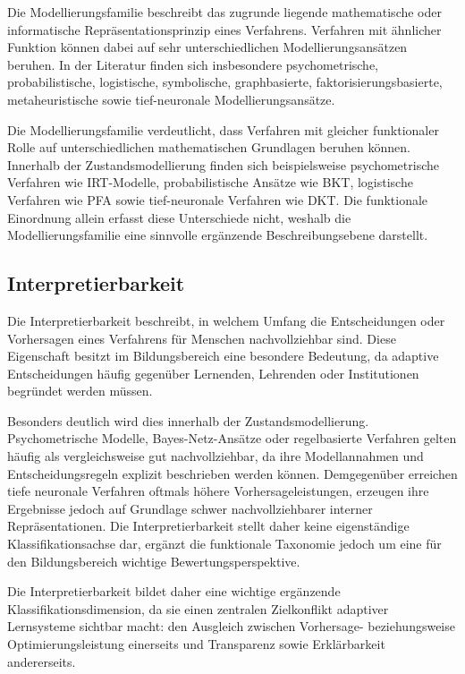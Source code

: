 Die Modellierungsfamilie beschreibt das zugrunde liegende mathematische
oder informatische Repräsentationsprinzip eines Verfahrens. Verfahren
mit ähnlicher Funktion können dabei auf sehr unterschiedlichen
Modellierungsansätzen beruhen. In der Literatur finden sich insbesondere
psychometrische, probabilistische, logistische, symbolische,
graphbasierte, faktorisierungsbasierte, metaheuristische sowie
tief-neuronale Modellierungsansätze.

Die Modellierungsfamilie verdeutlicht, dass Verfahren mit gleicher
funktionaler Rolle auf unterschiedlichen mathematischen Grundlagen
beruhen können. Innerhalb der Zustandsmodellierung finden sich
beispielsweise psychometrische Verfahren wie IRT-Modelle,
probabilistische Ansätze wie BKT, logistische Verfahren wie PFA sowie
tief-neuronale Verfahren wie DKT. Die funktionale Einordnung allein
erfasst diese Unterschiede nicht, weshalb die Modellierungsfamilie eine
sinnvolle ergänzende Beschreibungsebene darstellt.

\subsection{Interpretierbarkeit}\label{interpretierbarkeit}

Die Interpretierbarkeit beschreibt, in welchem Umfang die Entscheidungen
oder Vorhersagen eines Verfahrens für Menschen nachvollziehbar sind.
Diese Eigenschaft besitzt im Bildungsbereich eine besondere Bedeutung,
da adaptive Entscheidungen häufig gegenüber Lernenden, Lehrenden oder
Institutionen begründet werden müssen.

Besonders deutlich wird dies innerhalb der Zustandsmodellierung.
Psychometrische Modelle, Bayes-Netz-Ansätze oder regelbasierte Verfahren
gelten häufig als vergleichsweise gut nachvollziehbar, da ihre
Modellannahmen und Entscheidungsregeln explizit beschrieben werden
können. Demgegenüber erreichen tiefe neuronale Verfahren oftmals höhere
Vorhersageleistungen, erzeugen ihre Ergebnisse jedoch auf Grundlage
schwer nachvollziehbarer interner Repräsentationen. Die
Interpretierbarkeit stellt daher keine eigenständige
Klassifikationsachse dar, ergänzt die funktionale Taxonomie jedoch um
eine für den Bildungsbereich wichtige Bewertungsperspektive.

Die Interpretierbarkeit bildet daher eine wichtige ergänzende
Klassifikationsdimension, da sie einen zentralen Zielkonflikt adaptiver
Lernsysteme sichtbar macht: den Ausgleich zwischen Vorhersage-
beziehungsweise Optimierungsleistung einerseits und Transparenz sowie
Erklärbarkeit andererseits.

